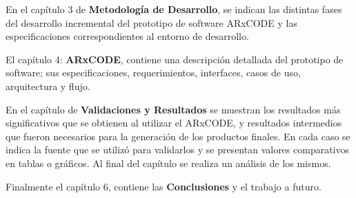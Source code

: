 En el cap\'itulo 3 de {\bf{Metodolog\'ia de Desarrollo}}, se indican las distintas fases del desarrollo incremental del prototipo de software ARxCODE    y las especificaciones correspondientes al entorno de desarrollo. 

El cap\'itulo 4: {\bf{ARxCODE}}, contiene una descripci\'on detallada del prototipo de software; sus especificaciones, requerimientos, interfaces, casos de uso, arquitectura y flujo. 

En el cap\'itulo de {\bf{Validaciones y Resultados}} se muestran los resultados m\'as significativos que se obtienen al utilizar el ARxCODE, y resultados intermedios que fueron necesarios para la generaci\'on de los productos finales. En cada caso se indica la fuente que se utiliz\'o para validarlos y se presentan valores comparativos en tablas o gr\'aficos. Al final del cap\'itulo se realiza un an\'alisis de los mismos. 

Finalmente el cap\'itulo 6, contiene las {\bf{Conclusiones}} y el trabajo a futuro. 


\endinput